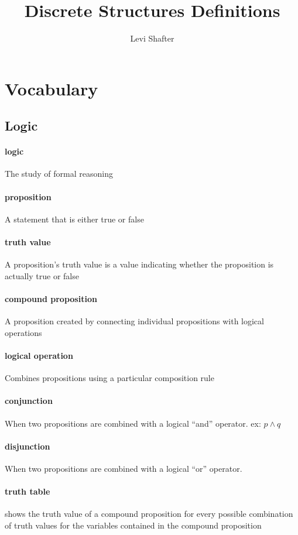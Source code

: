 \documentclass[a4paper]{article}
\begin{document}
\title{Discrete Structures Definitions}
\author{Levi Shafter}
\maketitle
\pagebreak

\section{Vocabulary}

\subsection{Logic}
\paragraph{logic} The study of formal reasoning
\paragraph{proposition} A statement that is either true or false
\paragraph{truth value} A proposition's truth value is a value indicating whether the proposition is actually true or false
\paragraph{compound proposition} A proposition created by connecting individual propositions with logical operations
\paragraph{logical operation} Combines propositions using a particular composition rule
\paragraph{conjunction} When two propositions are combined with a logical ``and'' operator. ex: $p \land q$
\paragraph{disjunction} When two propositions are combined with a logical ``or'' operator. 
\paragraph{truth table} shows the truth value of a compound proposition for every possible combination of truth values for the variables contained in the compound proposition
\end{document}
